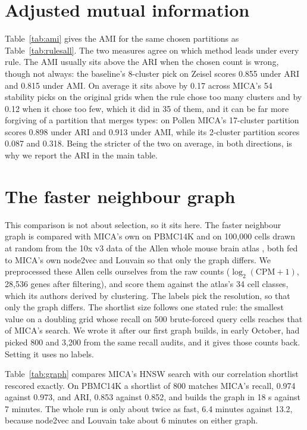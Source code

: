 

\section{Adjusted mutual information}\label{app:ami}
Table~\ref{tab:ami} gives the AMI for the same chosen partitions as Table~\ref{tab:rulesall}.
The two measures agree on which method leads under every rule. The AMI usually sits above the
ARI when the chosen count is wrong, though not always: the baseline's 8-cluster pick on Zeisel
scores 0.855 under ARI and 0.815 under AMI. On average it sits above by 0.17 across MICA's
54 stability picks on the original grids when the rule chose too many clusters and by 0.12 when it
chose too few, which it did in 35 of them, and it can be far more forgiving of
a partition that merges types: on Pollen MICA's 17-cluster partition scores 0.898 under ARI and 0.913 under AMI, while
its 2-cluster partition scores 0.087 and 0.318. Being the stricter of the two on average, in
both directions, is why we report the ARI in the main table.



\section{The faster neighbour graph}\label{app:graph}
This comparison is not about selection, so it sits here. The faster neighbour graph is compared with
MICA's own on PBMC14K and on 100,000 cells drawn at random from the 10x v3 data of the Allen whole mouse
brain atlas \cite{yao2023allen}, both fed to MICA's own node2vec and Louvain so that only the graph
differs. We preprocessed these Allen cells ourselves from the raw counts ($\log_2(\mathrm{CPM}+1)$, 28,536
genes after filtering), and score them against the atlas's 34 cell classes, which its authors derived
by clustering. The labels pick the resolution, so that only the graph differs. The shortlist size
follows one stated rule: the smallest value on a doubling grid whose recall on 500 brute-forced query
cells reaches that of MICA's search. We wrote it after our first graph builds, in early October, had picked 800 and 3,200 from the same
recall audits, and it gives those counts back. Setting it uses no labels.



Table~\ref{tab:graph} compares MICA's HNSW search with our correlation shortlist rescored exactly. On PBMC14K a shortlist of 800
matches MICA's recall, 0.974 against 0.973, and ARI, 0.853 against 0.852, and builds the graph in 18 s against 7 minutes. The whole run is only about twice as fast, 6.4 minutes against
13.2, because node2vec and Louvain take about 6 minutes on either graph.

